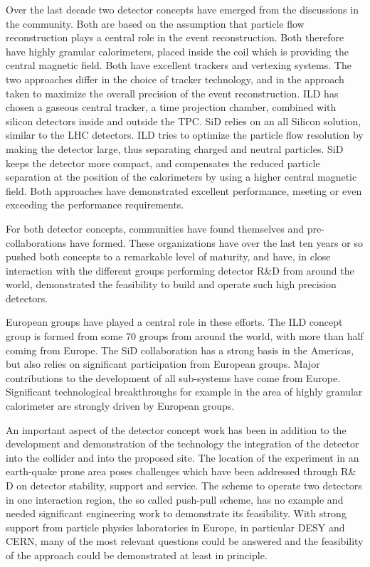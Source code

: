 \documentclass[%
 reprint,
 amsmath,amssymb,
 aps,
]{revtex4-1}
\begin{document}
Over the last decade two detector concepts have emerged from the discussions in the community. Both are based on the assumption that particle flow reconstruction plays a central role in the event reconstruction. Both therefore have highly granular calorimeters, placed inside the coil which is providing the central magnetic field. Both have excellent trackers and vertexing systems. The two approaches differ in the choice of tracker technology, and in the approach taken to maximize the overall precision of the event reconstruction. ILD has chosen a gaseous central tracker, a time projection chamber, combined with silicon detectors inside and outside the TPC. SiD relies on an all Silicon solution, similar to the LHC detectors. ILD tries to optimize the particle flow resolution by making the detector large, thus separating charged and neutral particles. SiD keeps the detector more compact, and compensates the reduced particle separation at the position of the calorimeters by using a higher central magnetic field. Both approaches have demonstrated excellent performance, meeting or even exceeding the performance requirements. 

For both detector concepts, communities have found themselves and pre-collaborations have formed. These organizations have over the last ten years or so pushed both concepts to a remarkable level of maturity, and have, in close interaction with the different groups performing detector R\&D from around the world, demonstrated the feasibility to build and operate such high precision detectors. 

European groups have played a central role in these efforts. The ILD concept group is formed from some 70 groups from around the world, with more than half coming from Europe. The SiD collaboration has a strong basis in the Americas, but also relies on significant participation from European groups. Major contributions to the development of all sub-systems have come from Europe. Significant technological breakthroughs for example in the area of highly granular calorimeter are strongly driven by European groups. 

An important aspect of the detector concept work has been in addition to the development and demonstration of the technology the integration of the detector into the collider and into the proposed site. The location of the experiment in an earth-quake prone area poses challenges which have been addressed through R\& D on detector stability, support and service. The scheme to operate two detectors in one interaction region, the so called push-pull scheme, has no example and needed significant engineering work to demonstrate its feasibility. With strong support from particle physics laboratories in Europe, in  particular DESY and CERN, many of the most relevant questions could be answered and the feasibility of the approach could be demonstrated at least in principle. 
\end{document}

